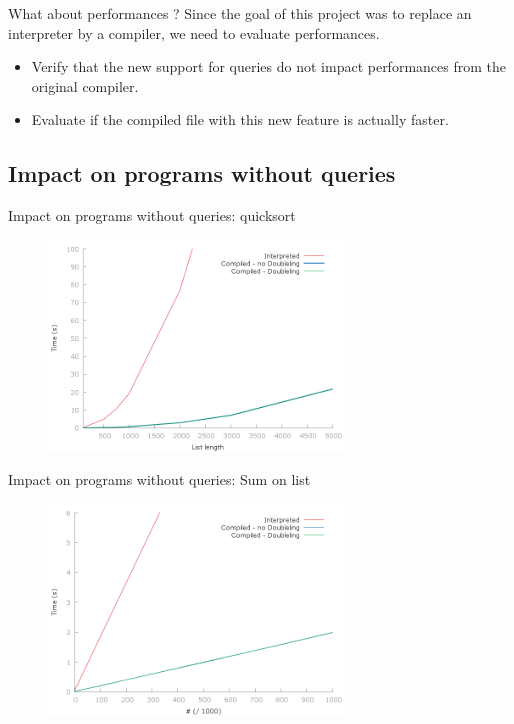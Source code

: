 \documentclass[11pt]{beamer}
\begin{document}
\begin{frame}{What about performances ?}
  Since the goal of this project was to replace an interpreter by a compiler, we need to evaluate performances.\pause
  \begin{itemize}
  \item Verify that the new support for queries do not impact performances from the original compiler.
  \item Evaluate if the compiled file with this new feature is actually faster.
  \end{itemize}
\end{frame}

\subsection{Impact on programs without queries}

\begin{frame}{Impact on programs without queries: quicksort}
  \begin{figure}[htbp]
    \centering
    \includegraphics[width=0.7\textwidth]{quicksort.png}
  \end{figure}
\end{frame}

\begin{frame}{Impact on programs without queries: Sum on list}
  \begin{figure}[htbp]
    \centering
    \includegraphics[width=0.7\textwidth]{sumlist.png}
  \end{figure}
\end{frame}
\end{document}
